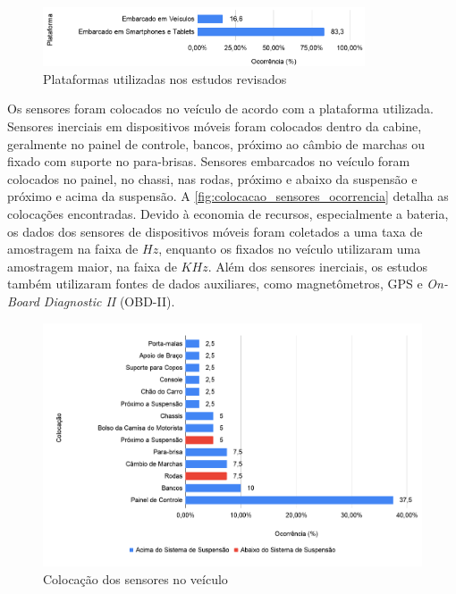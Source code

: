 \begin{figure}[h!]
  \centering
  \caption{Plataformas utilizadas nos estudos revisados}
   \label{fig:plataformas_ocorrencia}
   \includegraphics[width=0.85\textwidth]{figuras/fig_15.png}
\end{figure}

Os sensores foram colocados no veículo de acordo com a plataforma utilizada. Sensores inerciais em dispositivos móveis foram colocados dentro da cabine, geralmente no painel de controle, bancos, próximo ao câmbio de marchas ou fixado com suporte no para-brisas. Sensores embarcados no veículo foram colocados no painel, no chassi, nas rodas, próximo e abaixo da suspensão e próximo e acima da suspensão. A \autoref{fig:colocacao_sensores_ocorrencia} detalha as colocações encontradas. Devido à economia de recursos, especialmente a bateria, os dados dos sensores de dispositivos móveis foram coletados a uma taxa de amostragem na faixa de $Hz$, enquanto os fixados no veículo utilizaram uma amostragem maior, na faixa de $KHz$. Além dos sensores inerciais, os estudos também utilizaram fontes de dados auxiliares, como magnetômetros, GPS e \textit{On-Board Diagnostic II} (OBD-II).

\begin{figure}[h!]
  \centering
  \caption{Colocação dos sensores no veículo}
   \label{fig:colocacao_sensores_ocorrencia}
   \includegraphics[width=1\textwidth]{figuras/fig_16.png}
\end{figure}

